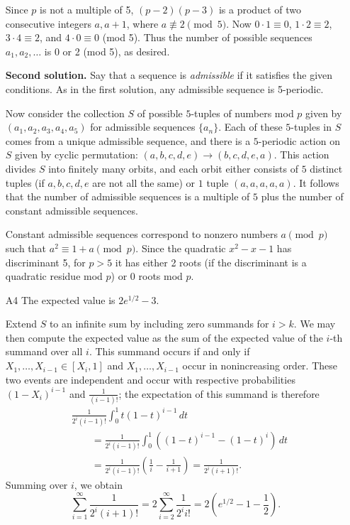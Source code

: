 \documentclass[amssymb,twocolumn,pra,10pt,aps]{revtex4-1}
\begin{document}
\begin{itemize}
Since $p$ is not a multiple of 5, $(p-2)(p-3)$ is a product of two consecutive integers $a,a+1$, where $a\not\equiv 2 \pmod{5}$. Now $0\cdot 1\equiv 0$, $1\cdot 2 \equiv 2$, $3\cdot 4\equiv 2$, and $4\cdot 0 \equiv 0$ (mod 5).  Thus the number of possible sequences $a_1,a_2,\ldots$ is 0 or 2 (mod 5), as desired. 

\noindent
\textbf{Second solution.}
Say that a sequence is \textit{admissible} if it satisfies the given conditions. As in the first solution, any admissible sequence is 5-periodic.

Now consider the collection $S$ of possible $5$-tuples of numbers mod $p$ given by $(a_1,a_2,a_3,a_4,a_5)$ for admissible sequences $\{a_n\}$. Each of these $5$-tuples in $S$ comes from a unique admissible sequence, and there is a $5$-periodic action on $S$ given by cyclic permutation: $(a,b,c,d,e) \rightarrow (b,c,d,e,a)$. This action divides $S$ into finitely many orbits, and each orbit either consists of $5$ distinct tuples (if $a,b,c,d,e$ are not all the same) or $1$ tuple $(a,a,a,a,a)$. It follows that the number of admissible sequences is a multiple of $5$ plus the number of constant admissible sequences.

Constant admissible sequences correspond to nonzero numbers $a \pmod{p}$ such that $a^2 \equiv 1+a \pmod{p}$.
Since the quadratic $x^2-x-1$ has discriminant 5, for $p > 5$ it has either 2 roots (if the discriminant is a quadratic residue mod $p$) or 0 roots mod $p$.


\item[A4]
The expected value is $2e^{1/2}-3$.

Extend $S$ to an infinite sum by including zero summands for $i> k$. We may then compute the expected value as the sum of the expected value of the $i$-th summand over all $i$. This summand
occurs if and only if $X_1,\dots,X_{i-1} \in [X_i, 1]$
and $X_1,\dots,X_{i-1}$ occur in nonincreasing order. These two events are independent and occur with respective probabilities $(1-X_i)^{i-1}$ and $\frac{1}{(i-1)!}$; the expectation of this summand is therefore
\begin{align*}
&\frac{1}{2^i(i-1)!} \int_0^1 t (1-t)^{i-1}\,dt \\
&\qquad = \frac{1}{2^i(i-1)!} \int_0^1 ((1-t)^{i-1} - (1-t)^i)\,dt \\
&\qquad = \frac{1}{2^i(i-1)!} \left( \frac{1}{i} - \frac{1}{i+1} \right) = \frac{1}{2^i (i+1)!}.
\end{align*}
Summing over $i$, we obtain
\[
\sum_{i=1}^\infty \frac{1}{2^i (i+1)!}
= 2 \sum_{i=2}^\infty \frac{1}{2^i i!}
= 2\left(e^{1/2}-1-\frac{1}{2} \right).
\]



\end{itemize}
\end{document}
